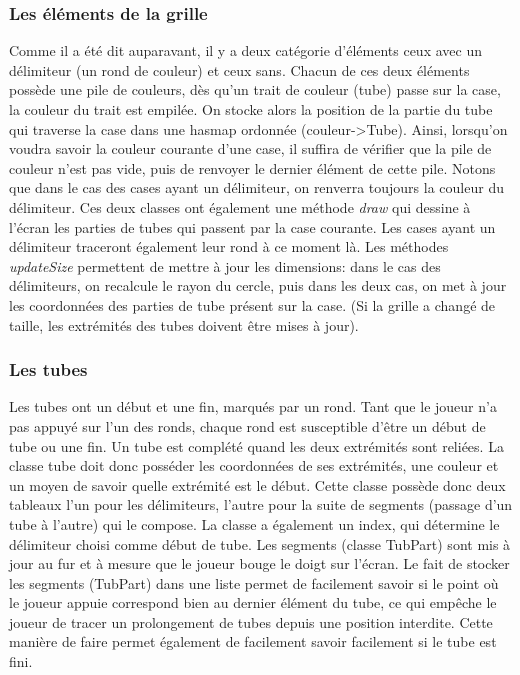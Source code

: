 \documentclass[12pt, a4paper]{article}%
\begin{document}
    \subsubsection{Les éléments de la grille}
    Comme il a été dit auparavant, il y a deux catégorie d'éléments ceux avec un délimiteur (un rond de couleur) et ceux sans.
    Chacun de ces deux éléments possède une pile de couleurs, dès qu'un trait de couleur (tube) passe sur la case, la couleur du
    trait est empilée. On stocke alors la position de la partie du tube qui traverse la case dans une hasmap ordonnée
    (couleur->Tube). Ainsi, lorsqu'on voudra savoir la couleur courante d'une case, il suffira de vérifier que la pile de couleur
    n'est pas vide, puis de renvoyer le dernier élément de cette pile. Notons que dans le cas des cases ayant un délimiteur, on
    renverra toujours la couleur du délimiteur. Ces deux classes ont également une méthode \textit{draw} qui dessine à l'écran les
    parties de tubes qui passent par la case courante. Les cases ayant un délimiteur traceront également leur rond à ce moment là.
    Les méthodes \textit{updateSize} permettent de mettre à jour les dimensions: dans le cas des délimiteurs, on recalcule le
    rayon du cercle, puis dans les deux cas, on met à jour les coordonnées des parties de tube présent sur la case. (Si la grille
    a changé de taille, les extrémités des tubes doivent être mises à jour).
    \subsubsection{Les tubes}
    Les tubes ont un début et une fin, marqués par un rond. Tant que le joueur n'a pas appuyé sur l'un des ronds, chaque rond est
    susceptible d'être un début de tube ou une fin. Un tube est complété quand les deux extrémités sont reliées. La classe tube
    doit donc posséder les coordonnées de ses extrémités, une couleur et un moyen de savoir quelle extrémité est le début. 
    Cette classe possède donc deux tableaux l'un pour les délimiteurs, l'autre pour la suite de segments (passage d'un tube à
    l'autre) qui le compose. La classe a également un index, qui détermine le délimiteur choisi comme début de tube.
    Les segments (classe TubPart) sont mis à jour au fur et à mesure que le joueur bouge le doigt sur l'écran.
    Le fait de  stocker les segments (TubPart) dans une liste permet de facilement savoir si le point où le joueur appuie
    correspond bien au dernier élément du tube, ce qui empêche le joueur de tracer un prolongement de tubes depuis une position
    interdite. Cette manière de faire permet également de facilement savoir facilement si le tube est fini.
    \newline
\end{document}
